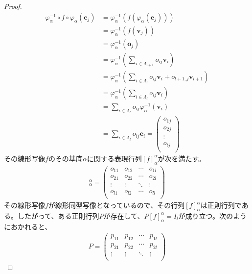 \documentclass[dvipdfmx]{jsarticle}
\begin{document}
\begin{proof}
\begin{align*}
\varphi_{\alpha}^{- 1} \circ f \circ \varphi_{\alpha}\left( \mathbf{e}_{j} \right) &= \varphi_{\alpha}^{- 1}\left( f\left( \varphi_{\alpha}\left( \mathbf{e}_{j} \right) \right) \right)\\
&= \varphi_{\alpha}^{- 1}\left( f\left( \mathbf{v}_{j} \right) \right)\\
&= \varphi_{\alpha}^{- 1}\left( \mathbf{o}_{j} \right)\\
&= \varphi_{\alpha}^{- 1}\left( \sum_{i \in \varLambda_{l + 1}} {o_{ij}\mathbf{v}_{i}} \right)\\
&= \varphi_{\alpha}^{- 1}\left( \sum_{i \in \varLambda_{l}} {o_{ij}\mathbf{v}_{i}} + o_{l + 1,j}\mathbf{v}_{l + 1} \right)\\
&= \varphi_{\alpha}^{- 1}\left( \sum_{i \in \varLambda_{l}} {o_{ij}\mathbf{v}_{i}} \right)\\
&= \sum_{i \in \varLambda_{l}} {o_{ij}\varphi_{\alpha}^{- 1}\left( \mathbf{v}_{i} \right)}\\
&= \sum_{i \in \varLambda_{l}} {o_{ij}\mathbf{e}_{i}} = \begin{pmatrix}
o_{1j} \\
o_{2j} \\
 \vdots \\
o_{lj} \\
\end{pmatrix}
\end{align*}
その線形写像$f$のその基底$\alpha$に関する表現行列$[ f]_{\alpha}^{\alpha}$が次を満たす。
\begin{align*}
[ f]_{\alpha}^{\alpha} = \begin{pmatrix}
o_{11} & o_{12} & \cdots & o_{1l} \\
o_{21} & o_{22} & \cdots & o_{2l} \\
 \vdots & \vdots & \ddots & \vdots \\
o_{l1} & o_{l2} & \cdots & o_{ll} \\
\end{pmatrix}
\end{align*}
その線形写像$f$が線形同型写像となっているので、その行列$[ f]_{\alpha}^{\alpha}$は正則行列である。したがって、ある正則行列$P$が存在して、$P[ f]_{\alpha}^{\alpha} = I_{l}$が成り立つ。次のようにおかれると、
\begin{align*}
P = \begin{pmatrix}
p_{11} & p_{12} & \cdots & p_{1l} \\
p_{21} & p_{22} & \cdots & p_{2l} \\
 \vdots & \vdots & \ddots & \vdots \\

\end{pmatrix}
\end{align*}
\end{proof}
\end{document}
